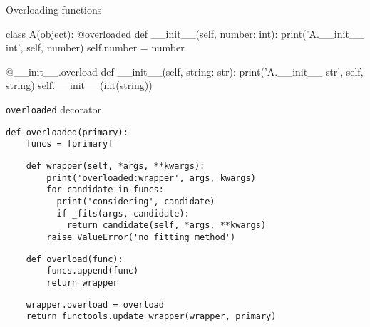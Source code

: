 \documentclass{beamer}
\begin{document}

\begin{frame}[fragile]{Overloading functions}
  \begin{pycode}
    class A(object):
        @overloaded
        def __init__(self, number: int):
            print('A.__init__ int', self, number)
            self.number = number
  \end{pycode}
  \pause
  \begin{pycode}
        @__init__.overload
        def __init__(self, string: str):
            print('A.__init__ str', self, string)
            self.__init__(int(string))
  \end{pycode}
\end{frame}

\begin{frame}[fragile]{\texttt{overloaded} decorator}
  \begin{verbatim}
def overloaded(primary):
    funcs = [primary]
  \end{verbatim}
  \pause
  \begin{verbatim}
    def wrapper(self, *args, **kwargs):
        print('overloaded:wrapper', args, kwargs)
        for candidate in funcs:
          print('considering', candidate)
          if _fits(args, candidate):
            return candidate(self, *args, **kwargs)
        raise ValueError('no fitting method')
  \end{verbatim}
  \pause
  \begin{verbatim}
    def overload(func):
        funcs.append(func)
        return wrapper
  \end{verbatim}
  \pause
  \begin{verbatim}
    wrapper.overload = overload
    return functools.update_wrapper(wrapper, primary)
  \end{verbatim}
\end{frame}
\end{document}
